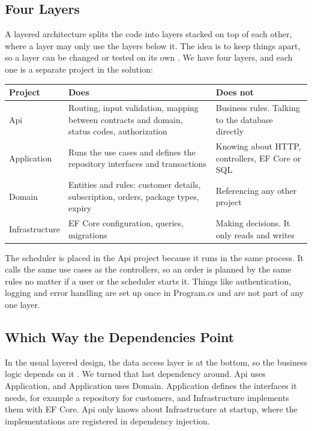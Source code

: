 \documentclass[a4paper,11pt]{article}
\begin{document}
\subsection{Four Layers}
A layered architecture splits the code into layers stacked on top of each other, where a layer may only use the layers below it. The idea is to keep things apart, so a layer can be changed or tested on its own \cite[ch.~3]{microsoft-application-architecture-guide}. We have four layers, and each one is a separate project in the solution:
\begin{center}
\begin{tabular}{@{}p{3.6cm} p{5.3cm} p{5.3cm}@{}}
\textbf{Project} & \textbf{Does} & \textbf{Does not} \\
\hline
Api & Routing, input validation, mapping between contracts and domain, status codes, authorization & Business rules. Talking to the database directly \\
\hline
Application & Runs the use cases and defines the repository interfaces and transactions & Knowing about HTTP, controllers, EF Core or SQL \\
\hline
Domain & Entities and rules: customer details, subscription, orders, package types, expiry & Referencing any other project \\
\hline
Infrastructure & EF Core configuration, queries, migrations & Making decisions. It only reads and writes \\
\hline
\end{tabular}
\end{center}
The scheduler is placed in the Api project because it runs in the same process. It calls the same use cases as the controllers, so an order is planned by the same rules no matter if a user or the scheduler starts it. Things like authentication, logging and error handling are set up once in Program.cs and are not part of any one layer.

\subsection{Which Way the Dependencies Point}
In the usual layered design, the data access layer is at the bottom, so the business logic depends on it \cite[ch.~5]{microsoft-application-architecture-guide}. We turned that last dependency around. Api uses Application, and Application uses Domain. Application defines the interfaces it needs, for example a repository for customers, and Infrastructure implements them with EF Core. Api only knows about Infrastructure at startup, where the implementations are registered in dependency injection.
\end{document}
